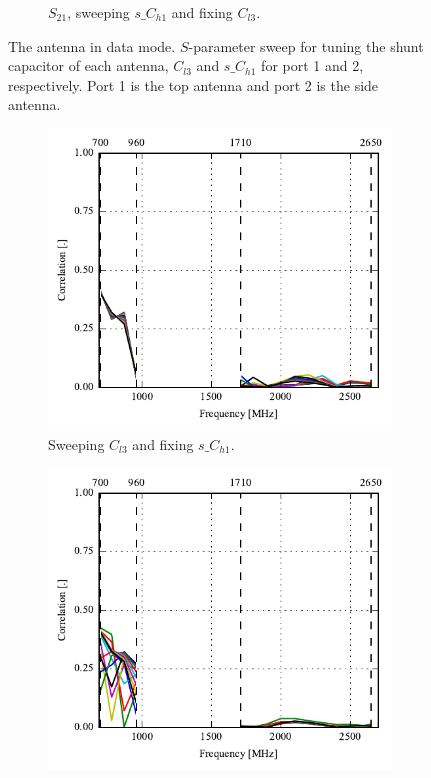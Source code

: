 \begin{figure}[htbp]
\begin{subfigure}[b]{0.49\linewidth}
        \caption{$S_{21}$, sweeping $s\_C_{h1}$ and fixing $C_{l3}$.}
    \end{subfigure}
    \caption{The antenna in data mode. $S$-parameter sweep for tuning the shunt capacitor of each antenna, $C_{l3}$ and $s\_C_{h1}$ for port 1 and 2, respectively. Port 1 is the top antenna and port 2 is the side antenna.}
    \label{fig:ant3_sparam_sweep_data}
\end{figure}

\begin{figure}[htbp]
    \centering
    \begin{subfigure}{0.49\linewidth}
        \includegraphics{img/tech_sol/nonresonant/simulation/data_mode/sweep_top_corr}
        \caption{Sweeping $C_{l3}$ and fixing $s\_C_{h1}$.}
    \end{subfigure}
    \hfill
    \begin{subfigure}{0.49\linewidth}
        \includegraphics{img/tech_sol/nonresonant/simulation/data_mode/sweep_side_corr}

\end{subfigure}
\end{figure}
